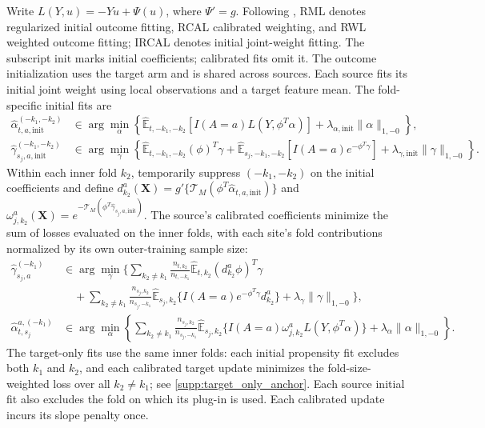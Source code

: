 \documentclass[12pt]{article}
\providecommand{\En}{\widehat{\mathbb E}}
\begin{document}
Write $L(Y,u)=-Yu+\Psi(u)$, where $\Psi'=g$. Following \citet{tan2020model}, RML denotes regularized initial outcome fitting, RCAL calibrated weighting, and RWL weighted outcome fitting; IRCAL denotes initial joint-weight fitting. The subscript $\mathrm{init}$ marks initial coefficients; calibrated fits omit it. The outcome initialization uses the target arm and is shared across sources. Each source fits its initial joint weight using local observations and a target feature mean. The fold-specific initial fits are
\[
\begin{aligned}
\widehat\alpha_{t,a,\mathrm{init}}^{(-k_1,-k_2)}
&\in\arg\min_\alpha\left\{\En_{t,-k_1,-k_2}[I(A=a)L(Y,\phi^T\alpha)]+\lambda_{\alpha,\mathrm{init}}\|\alpha\|_{1,-0}\right\},\\
\widehat\gamma_{s_j,a,\mathrm{init}}^{(-k_1,-k_2)}
&\in\arg\min_\gamma\left\{\En_{t,-k_1,-k_2}(\phi)^T\gamma
+\En_{s_j,-k_1,-k_2}[I(A=a)e^{-\phi^T\gamma}]+\lambda_{\gamma,\mathrm{init}}\|\gamma\|_{1,-0}\right\}.
\end{aligned}
\]
Within each inner fold $k_2$, temporarily suppress $(-k_1,-k_2)$ on the initial coefficients and define $d_{k_2}^a(\boldsymbol X)=g'\{\mathcal T_M(\phi^T\widehat\alpha_{t,a,\mathrm{init}})\}$ and $\omega_{j,k_2}^a(\boldsymbol X)=e^{-\mathcal T_M(\phi^T\widehat\gamma_{s_j,a,\mathrm{init}})}$. The source's calibrated coefficients minimize the sum of losses evaluated on the inner folds, with each site's fold contributions normalized by its own outer-training sample size:
\[
\begin{aligned}
\widehat\gamma_{s_j,a}^{(-k_1)}
&\in\arg\min_\gamma\Bigg\{\sum_{k_2\ne k_1}
\frac{n_{t,k_2}}{n_{t,-k_1}}\En_{t,k_2}(d_{k_2}^a\phi)^T\gamma\\
&\quad+\sum_{k_2\ne k_1}\frac{n_{s_j,k_2}}{n_{s_j,-k_1}}
\En_{s_j,k_2}\{I(A=a)e^{-\phi^T\gamma}d_{k_2}^a\}
+\lambda_\gamma\|\gamma\|_{1,-0}\Bigg\},\\
\widehat\alpha_{t,s_j}^{a,(-k_1)}
&\in\arg\min_\alpha\left\{\sum_{k_2\ne k_1}\frac{n_{s_j,k_2}}{n_{s_j,-k_1}}
\En_{s_j,k_2}\{I(A=a)\omega_{j,k_2}^aL(Y,\phi^T\alpha)\}
+\lambda_\alpha\|\alpha\|_{1,-0}\right\}.
\end{aligned}
\]
The target-only fits use the same inner folds: each initial propensity fit excludes both $k_1$ and $k_2$, and each calibrated target update minimizes the fold-size-weighted loss over all $k_2\ne k_1$; see \cref{supp:target_only_anchor}. Each source initial fit also excludes the fold on which its plug-in is used. Each calibrated update incurs its slope penalty once.
\end{document}

